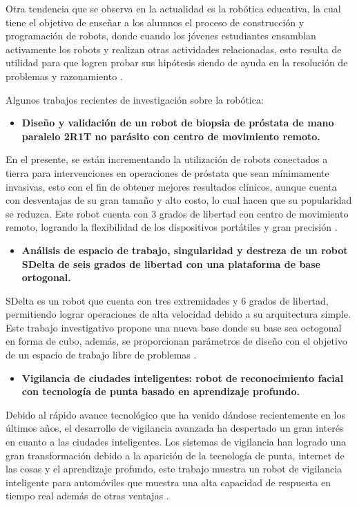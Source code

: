\documentclass[conference]{IEEEtran}
\begin{document}
Otra tendencia que se observa en la actualidad es la robótica educativa, la cual tiene el objetivo de enseñar a los alumnos el proceso de construcción y programación de robots, donde cuando los jóvenes estudiantes ensamblan activamente los robots y realizan otras actividades relacionadas, esto resulta de utilidad para que logren probar sus hipótesis siendo de ayuda en la resolución de problemas y razonamiento \cite{Ching2023}.

Algunos trabajos recientes de investigación sobre la robótica:

\begin{itemize}
\item \textbf{Diseño y validación de un robot de biopsia de próstata de mano paralelo 2R1T no parásito con centro de movimiento remoto.} 
\end{itemize}

En el presente, se están incrementando la utilización de robots conectados a tierra para intervenciones en operaciones de próstata que sean mínimamente invasivas, esto con el fin de obtener mejores resultados clínicos, aunque cuenta con desventajas de su gran tamaño y alto costo, lo cual hacen que su popularidad se reduzca. Este robot cuenta con 3 grados de libertad con centro de movimiento remoto, logrando la flexibilidad de los dispositivos portátiles y gran precisión \cite{Jiang2024}.

\begin{itemize}
\item \textbf{Análisis de espacio de trabajo, singularidad y destreza de un robot SDelta de seis grados de libertad con una plataforma de base ortogonal.} 
\end{itemize}
SDelta es un robot que cuenta con tres extremidades y 6 grados de libertad, permitiendo lograr operaciones de alta velocidad debido a su arquitectura simple.  Este trabajo investigativo propone una nueva base donde su base sea octogonal en forma de cubo, además, se proporcionan parámetros de diseño con el objetivo de un espacio de trabajo libre de problemas \cite{Toz2024}.

\begin{itemize}
\item \textbf{Vigilancia de ciudades inteligentes: robot de reconocimiento facial con tecnología de punta basado en aprendizaje profundo.} 
\end{itemize}
Debido al rápido avance tecnológico que ha venido dándose recientemente en los últimos años, el desarrollo de vigilancia avanzada ha despertado un gran interés en cuanto a las ciudades inteligentes. Los sistemas de vigilancia han logrado una gran transformación debido a la aparición de la tecnología de punta, internet de las cosas y el aprendizaje profundo, este trabajo muestra un robot de vigilancia inteligente para automóviles que muestra una alta capacidad de respuesta en tiempo real además de otras ventajas \cite{Medjdoubi2024}.
\end{document}
